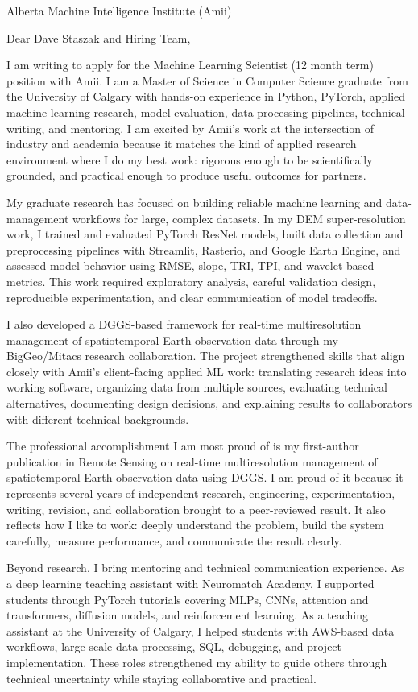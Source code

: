 \documentclass[11pt]{letter}
\begin{document}
\begin{letter}{Alberta Machine Intelligence Institute (Amii)}

\opening{Dear Dave Staszak and Hiring Team,}

I am writing to apply for the Machine Learning Scientist (12 month term) position with Amii. I am a Master of Science in Computer Science graduate from the University of Calgary with hands-on experience in Python, PyTorch, applied machine learning research, model evaluation, data-processing pipelines, technical writing, and mentoring. I am excited by Amii's work at the intersection of industry and academia because it matches the kind of applied research environment where I do my best work: rigorous enough to be scientifically grounded, and practical enough to produce useful outcomes for partners.

My graduate research has focused on building reliable machine learning and data-management workflows for large, complex datasets. In my DEM super-resolution work, I trained and evaluated PyTorch ResNet models, built data collection and preprocessing pipelines with Streamlit, Rasterio, and Google Earth Engine, and assessed model behavior using RMSE, slope, TRI, TPI, and wavelet-based metrics. This work required exploratory analysis, careful validation design, reproducible experimentation, and clear communication of model tradeoffs.

I also developed a DGGS-based framework for real-time multiresolution management of spatiotemporal Earth observation data through my BigGeo/Mitacs research collaboration. The project strengthened skills that align closely with Amii's client-facing applied ML work: translating research ideas into working software, organizing data from multiple sources, evaluating technical alternatives, documenting design decisions, and explaining results to collaborators with different technical backgrounds.

The professional accomplishment I am most proud of is my first-author publication in Remote Sensing on real-time multiresolution management of spatiotemporal Earth observation data using DGGS. I am proud of it because it represents several years of independent research, engineering, experimentation, writing, revision, and collaboration brought to a peer-reviewed result. It also reflects how I like to work: deeply understand the problem, build the system carefully, measure performance, and communicate the result clearly.

Beyond research, I bring mentoring and technical communication experience. As a deep learning teaching assistant with Neuromatch Academy, I supported students through PyTorch tutorials covering MLPs, CNNs, attention and transformers, diffusion models, and reinforcement learning. As a teaching assistant at the University of Calgary, I helped students with AWS-based data workflows, large-scale data processing, SQL, debugging, and project implementation. These roles strengthened my ability to guide others through technical uncertainty while staying collaborative and practical.


\end{letter}
\end{document}
